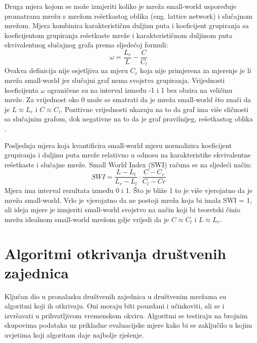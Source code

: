 \documentclass[times, utf8, diplomski]{fer}
\begin{document}
Druga mjera kojom se može izmjeriti koliko je mreža small-world uspoređuje promatranu mrežu s mrežom rešetkastog oblika (eng. lattice network) i slučajnom mrežom. Mjera kombinira karakterističnu duljinu puta i koeficijent grupiranja sa koeficijentom grupiranja rešetkaste mreže i karakterističnom duljinom puta ekvivalentnog slučajnog grafa prema sljedećoj formuli:
\begin{equation}
	\omega = \dfrac{L_{r}}{L} - \dfrac{C}{C_{l}}
\end{equation}
Ovakva definicija nije osjetljiva na mjeru $ C_{r} $ koja nije primjerena za mjerenje je li mreža small-world jer slučajni graf nema svojstva grupiranja. Vrijednosti koeficijenta $\omega$ ograničene su na interval između -1 i 1 bez obzira na veličinu mreže. Za vrijednost oko 0 može se smatrati da je mreža small-world što znači da je $ L \approx L_{r} $ i $ C \approx C_{l} $. Pozitivne vrijednosti ukazuju na to da graf ima više sličnosti sa slučajnim grafom, dok negativne na to da je graf pravilnijeg, rešetkastog oblika \cite{telesford2011ubiquity}.


Posljednja mjera koja kvantificira small-world mjeru normalizira koeficijent grupiranja i duljinu puta mreže relativno u odnosu na karakteristike ekvivalentne rešetkaste i slučajne mreže. Small World Index (SWI) računa se na sljedeći način:
\begin{equation}
	SWI = \dfrac{L - L_{l}}{L_{r} - L_{l}} \cdot \dfrac{C - C_{r}}{C_{l} - C{r}}
\end{equation} 
Mjera ima interval rezultata između 0 i 1. Što je bliže 1 to je više vjerojatno da je mreža small-world. Vrlo je vjerojatno da ne postoji mreža koja bi imala SWI = 1, ali ideja mjere je izmjeriti small-world svojstvo na način koji bi teoretski činio mrežu idealnom small-world mrežom gdje vrijedi da je $ C \approx C_{l} $ i $ L \approx L_{r} $.





%
\chapter{Algoritmi otkrivanja društvenih zajednica}

Ključan dio u pronalasku društvenih zajednica u društvenim mrežama su algoritmi koji ih otkrivaju. Oni moraju biti pouzdani i učinkoviti, ali se i izvršavati u prihvatljivom vremenskom okviru. Algoritmi se testiraju na brojnim skupovima podataka uz prikladne evaluacijske mjere kako bi se zaključilo u kojim uvjetima koji algoritam daje najbolje rješenje. 
\end{document}
